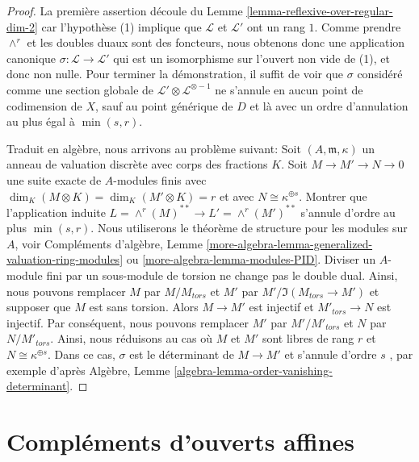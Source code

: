 \begin{proof}
La première assertion découle du Lemme  \ref{lemma-reflexive-over-regular-dim-2}  car l'hypothèse (1) implique
que  $\mathcal{L}$  et  $\mathcal{L}'$  ont un rang  $1$. Comme prendre
 $\wedge^r$  et les doubles duaux sont des foncteurs, nous obtenons donc une
application canonique  $\sigma : \mathcal{L} \to \mathcal{L}'$  qui est un isomorphisme sur l'ouvert non vide
de (1), et donc non nulle. Pour terminer la démonstration, il suffit de voir que
 $\sigma$  considéré comme une section globale de  $\mathcal{L}' \otimes \mathcal{L}^{\otimes -1}$  ne s'annule en
aucun point de codimension de  $X$, sauf au point générique de
 $D$  et là avec un ordre d'annulation au plus égal à  $\min(s, r)$.

\medskip\noindent
Traduit en algèbre, nous arrivons au problème suivant: Soit  $(A, \mathfrak m, \kappa)$  un anneau
de valuation discrète avec corps des fractions  $K$. Soit  $M \to M' \to N \to 0$  une
suite exacte de  $A$-modules finis avec  $\dim_K(M \otimes K) = \dim_K(M' \otimes K) = r$  et avec  $N \cong \kappa^{\oplus s}$.
Montrer que l'application induite  $L = \wedge^r(M)^{**} \to L' = \wedge^r(M')^{**}$  s'annule d'ordre au plus
 $\min(s, r)$. Nous utiliserons le théorème de structure pour les modules sur
 $A$, voir Compléments d'algèbre, Lemme  \ref{more-algebra-lemma-generalized-valuation-ring-modules}  ou  \ref{more-algebra-lemma-modules-PID}. Diviser
un  $A$-module fini par un sous-module de torsion ne change pas le double
dual. Ainsi, nous pouvons remplacer  $M$  par  $M/M_{tors}$  et  $M'$ 
par  $M'/\Im(M_{tors} \to M')$  et supposer que  $M$  est sans torsion. Alors  $M \to M'$ 
est injectif et  $M'_{tors} \to N$  est injectif. Par conséquent, nous pouvons remplacer
 $M'$  par  $M'/M'_{tors}$  et  $N$  par  $N/M'_{tors}$. Ainsi, nous
réduisons au cas où  $M$  et  $M'$  sont libres de rang  $r$ 
et  $N \cong \kappa^{\oplus s}$. Dans ce cas,  $\sigma$  est le déterminant de  $M \to M'$  et
s'annule d'ordre  $s$ , par exemple d'après Algèbre, Lemme  \ref{algebra-lemma-order-vanishing-determinant}.
\end{proof}









\section{Compléments d'ouverts affines}
\label{section-complement-affine-open}

